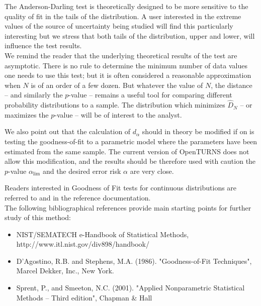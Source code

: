 {
  The Anderson-Darling test is theoretically designed to be more sensitive to the quality of fit in the tails of the distribution. A user interested in the extreme values of the source of uncertainty being studied will find this particularly interesting but we stress that both tails of the distribution, upper and lower, will influence the test results.\\

  We remind the reader that the underlying theoretical results of the test are asymptotic. There is no rule to determine the minimum number of data values one needs to use this test; but it is often considered a reasonable approximation when $N$ is of an order of a few dozen. But whatever the value of $N$, the distance -- and similarly the $p$-value -- remains a useful tool for comparing different probability distributions to a sample. The distribution which minimizes $\widehat{D}_N$ -- or maximizes the $p$-value -- will be of interest to the analyst.

  We also point out that the calculation of $d_\alpha$ should in theory be modified if on is testing the goodness-of-fit to a parametric model where the parameters have been estimated from the same sample. The current version of OpenTURNS does not allow this modification, and the results should be therefore used with caution the $p$-value $\alpha_\textrm{lim}$ and the desired error risk $\alpha$ are very close.

  Readers interested in Goodness of Fit tests for continuous distributions are referred to  and  in the reference documentation. \\

  The following bibliographical references provide main starting points for further study of this method:

  \begin{itemize}
  \item NIST/SEMATECH e-Handbook of Statistical Methods, http://www.itl.nist.gov/div898/handbook/
  \item D'Agostino, R.B. and Stephens, M.A. (1986). "Goodness-of-Fit Techniques", Marcel Dekker, Inc., New York.
  \item Sprent, P., and Smeeton, N.C. (2001). "Applied Nonparametric Statistical Methods -- Third edition", Chapman \& Hall
  \end{itemize}
}
